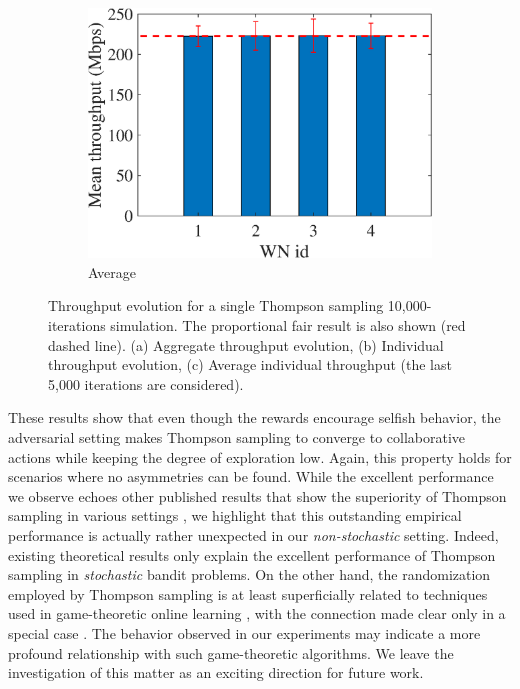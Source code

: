 \documentclass[preprint,12pt]{elsarticle}
\begin{document}
\begin{figure}
\begin{subfigure}[b]{.3\textwidth}
		\includegraphics[width=\textwidth]{images/NEW_mean_tpt_TS}
		\caption{Average}\label{fig:ts_avg_individual}
	\end{subfigure}
		\caption{Throughput evolution for a single Thompson sampling 10,000-iterations simulation. The proportional fair result is also shown (red dashed line). (a) Aggregate throughput evolution, (b) Individual throughput evolution, (c) Average individual throughput (the last 5,000 iterations are considered).}
		\label{fig:ts_tpt_evolution}
\end{figure}

These results show that even though the rewards encourage selfish behavior, the adversarial setting makes Thompson sampling to converge to collaborative actions while keeping the degree of exploration low. Again, this property holds for scenarios where no asymmetries can be found. While the excellent performance we observe echoes other published results that show the superiority of Thompson sampling in various settings \cite{LCLS10}, we highlight that this outstanding empirical performance is actually rather unexpected in our \emph{non-stochastic} setting. Indeed, existing theoretical results only explain the excellent performance of Thompson sampling in \emph{stochastic} bandit problems. On the other hand, the randomization employed by Thompson sampling is at least superficially related to techniques used in game-theoretic online learning \cite{FS97,CBLu06:book}, with the connection made clear only in a special case \cite{Gop13}. The behavior observed in our experiments may indicate a more profound relationship with such game-theoretic algorithms. We leave the investigation of this matter as an exciting direction for future work.
\end{document}
